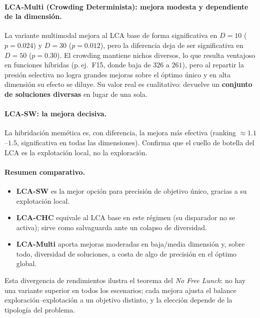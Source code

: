 \paragraph{LCA-Multi (Crowding Determinista): mejora modesta y dependiente de la dimensión.}
La variante multimodal mejora al LCA base de forma significativa en $D=10$ ($p=0.024$) y
$D=30$ ($p=0.012$), pero la diferencia deja de ser significativa en $D=50$ ($p=0.30$). El
crowding mantiene nichos diversos, lo que resulta ventajoso en funciones híbridas (p.\,ej.\
F15, donde baja de $326$ a $261$), pero al repartir la presión selectiva no logra grandes
mejoras sobre el óptimo único y en alta dimensión su efecto se diluye. Su valor real es
cualitativo: devuelve un \textbf{conjunto de soluciones diversas} en lugar de una sola.

\paragraph{LCA-SW: la mejora decisiva.}
La hibridación memética es, con diferencia, la mejora más efectiva (ranking $\approx 1.1$--$1.5$,
significativa en todas las dimensiones). Confirma que el cuello de botella del LCA es la
explotación local, no la exploración.

\paragraph{Resumen comparativo.}
\begin{itemize}
  \item \textbf{LCA-SW} es la mejor opción para precisión de objetivo único, gracias a su
        explotación local.
  \item \textbf{LCA-CHC} equivale al LCA base en este régimen (su disparador no se activa);
        sirve como salvaguarda ante un colapso de diversidad.
  \item \textbf{LCA-Multi} aporta mejoras moderadas en baja/media dimensión y, sobre todo,
        diversidad de soluciones, a costa de algo de precisión en el óptimo global.
\end{itemize}

Esta divergencia de rendimientos ilustra el teorema del \emph{No Free Lunch}: no hay una
variante superior en todos los escenarios; cada mejora ajusta el balance
exploración--explotación a un objetivo distinto, y la elección depende de la tipología del
problema.

